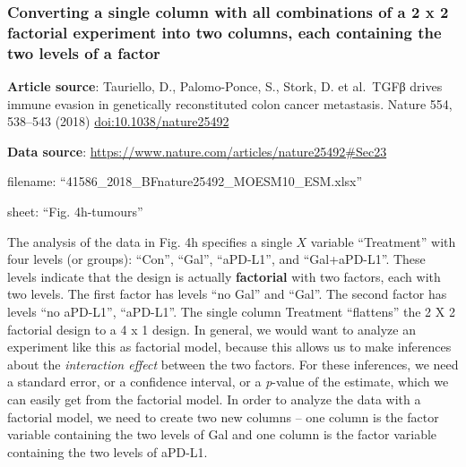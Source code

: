 \documentclass[]{book}
\begin{document}
\hypertarget{converting-a-single-column-with-all-combinations-of-a-2-x-2-factorial-experiment-into-two-columns-each-containing-the-two-levels-of-a-factor}{%
\subsubsection{Converting a single column with all combinations of a 2 x 2 factorial experiment into two columns, each containing the two levels of a factor}\label{converting-a-single-column-with-all-combinations-of-a-2-x-2-factorial-experiment-into-two-columns-each-containing-the-two-levels-of-a-factor}}

\textbf{Article source}: Tauriello, D., Palomo-Ponce, S., Stork, D. et al.~TGFβ drives immune evasion in genetically reconstituted colon cancer metastasis. Nature 554, 538--543 (2018) \url{doi:10.1038/nature25492}

\textbf{Data source}: \url{https://www.nature.com/articles/nature25492\#Sec23}

filename: ``41586\_2018\_BFnature25492\_MOESM10\_ESM.xlsx''

sheet: ``Fig. 4h-tumours''

The analysis of the data in Fig. 4h specifies a single \(X\) variable ``Treatment'' with four levels (or groups): ``Con'', ``Gal'', ``aPD-L1'', and ``Gal+aPD-L1''. These levels indicate that the design is actually \textbf{factorial} with two factors, each with two levels. The first factor has levels ``no Gal'' and ``Gal''. The second factor has levels ``no aPD-L1'', ``aPD-L1''. The single column Treatment ``flattens'' the 2 X 2 factorial design to a 4 x 1 design. In general, we would want to analyze an experiment like this as factorial model, because this allows us to make inferences about the \emph{interaction effect} between the two factors. For these inferences, we need a standard error, or a confidence interval, or a \emph{p}-value of the estimate, which we can easily get from the factorial model. In order to analyze the data with a factorial model, we need to create two new columns -- one column is the factor variable containing the two levels of Gal and one column is the factor variable containing the two levels of aPD-L1.
\end{document}
